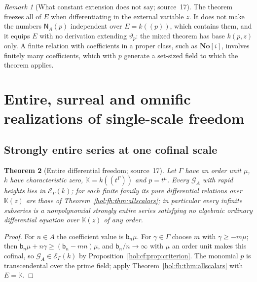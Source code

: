 \documentclass[11pt]{article}
\numberwithin{equation}{section}
\newtheorem{theorem}{Theorem}[section]
\theoremstyle{definition}
\theoremstyle{remark}
\newtheorem{remark}[theorem]{Remark}
\newcommand{\No}{\mathbf{No}}
\newcommand{\KK}{\mathbb K}
\newcommand{\EK}{\mathcal E_\Gamma(k)}
\begin{document}
\begin{remark}[What constant extension does not say; source~17]
\label{hol:fh:rem:constext}
The theorem freezes all of $E$ when differentiating in the external variable
$z$. It does not make the numbers $\mathsf N_A(p)$ independent over $E=k((p))$,
which contains them, and it equips $E$ with no derivation extending
$\vartheta_p$: the mixed theorem has base $k(p,z)$ only. A finite relation
with coefficients in a proper class, such as $\No[i]$, involves finitely many
coefficients, which with $p$ generate a set-sized field to which the theorem
applies.
\end{remark}

\section{Entire, surreal and omnific realizations of single-scale freedom}
\label{hol:fh:sec:realizations}

\subsection{Strongly entire series at one cofinal scale}
\label{hol:fh:sub:entire}

\begin{theorem}[Entire differential freedom; source~17]
\label{hol:fh:thm:entire}
Let $\Gamma$ have an order unit $\mu$, $k$ have characteristic zero,
$\KK=k((t^\Gamma))$ and $p=t^\mu$. Every $\mathcal G_A$ with rapid heights lies
in $\EK$; for each finite family its pure differential relations over $\KK(z)$
are those of Theorem~\ref{hol:fh:thm:allscalars}; in particular every infinite
subseries is a nonpolynomial strongly entire series satisfying no algebraic
ordinary differential equation over $\KK(z)$ of any order.
\end{theorem}

\begin{proof}
For $n\in A$ the coefficient value is $\mathsf b_n\mu$. For $\gamma\in\Gamma$
choose $m$ with $\gamma\ge-m\mu$; then $\mathsf b_n\mu+n\gamma\ge(\mathsf
b_n-mn)\mu$, and $\mathsf b_n/n\to\infty$ with $\mu$ an order unit makes this
cofinal, so $\mathcal G_A\in\EK$ by Proposition~\ref{hol:cf:prop:criterion}.
The monomial $p$ is transcendental over the prime field; apply
Theorem~\ref{hol:fh:thm:allscalars} with $E=\KK$.
\end{proof}
\end{document}
